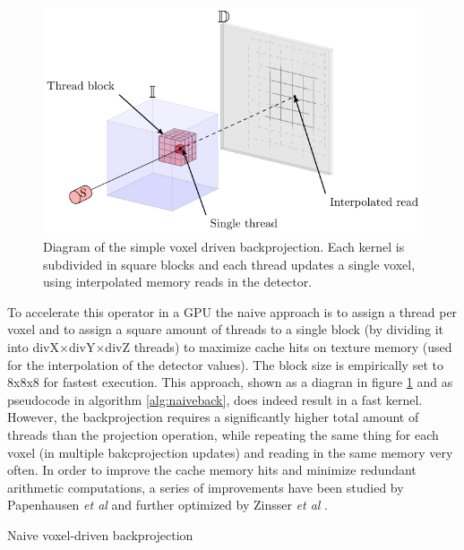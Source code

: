 \begin{figure}
\begin{center}

\includegraphics{GPUmethods/simplebackproj-figure0.pdf} 
\end{center}

\caption{\label{fig:simpleback} Diagram of the simple voxel driven backprojection. Each kernel is subdivided in square blocks and each thread updates a single voxel, using interpolated memory reads in the detector.} 
\end{figure}


To accelerate this operator in a GPU the naive approach is to assign a thread per voxel and to assign a square amount of threads to a single block (by dividing it into divX$\times$divY$\times$divZ threads) to maximize cache hits on texture memory (used for the interpolation of the detector values). The block size is empirically set to 8x8x8 for fastest execution. This approach, shown as a diagran in figure \ref{fig:simpleback} and as pseudocode in algorithm \ref{alg:naiveback}, does indeed result in a fast kernel. However, the backprojection requires a significantly higher total amount of threads than the projection operation, while repeating the same thing for each voxel (in multiple bakcprojection updates) and reading in the same memory very often. In order to improve the cache memory hits and minimize redundant arithmetic computations, a series of improvements have been studied by Papenhausen \emph{et al}\cite{papenhausen2011gpu} and further optimized by Zinsser \emph{et al} \cite{zinsser2013systematic}.

\begin{algorithm}

\caption{Naive voxel-driven backprojection
\label{alg:naiveback}}
\begin{algorithmic}[1]


\EndKernel
\EndFor

\end{algorithmic}

\end{algorithm}


